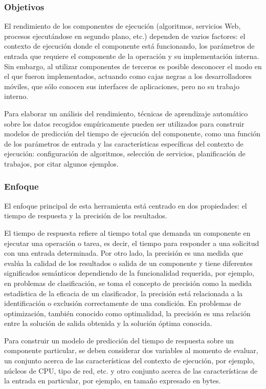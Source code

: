 \subsubsection*{Objetivos}

El rendimiento de los componentes de ejecución (algoritmos, servicios
Web, procesos ejecutándose en segundo plano, etc.) dependen de varios
factores: el contexto de ejecución donde el componente está funcionando,
los parámetros de entrada que requiere el componente de la operación
y su implementación interna. Sin embargo, al utilizar componentes
de terceros es posible desconocer el modo en el que fueron implementados,
actuando como cajas negras a los desarrolladores móviles, que sólo
conocen sus interfaces de aplicaciones, pero no su trabajo interno. 

Para elaborar un análisis del rendimiento, técnicas de aprendizaje
automático sobre los datos recogidos empíricamente pueden ser utilizados
para construir modelos de predicción del tiempo de ejecución del componente,
como una función de los parámetros de entrada y las características
específicas del contexto de ejecución: configuración de algoritmos,
selección de servicios, planificación de trabajos, por citar algunos
ejemplos. 


\subsubsection*{Enfoque}

El enfoque principal de esta herramienta está centrado en dos propiedades:
el tiempo de respuesta y la precisión de los resultados. 

El tiempo de respuesta refiere al tiempo total que demanda un componente
en ejecutar una operación o tarea, es decir, el tiempo para responder
a una solicitud con una entrada determinada. Por otro lado, la precisión
es una medida que evalúa la calidad de los resultados o salida de
un componente y tiene diferentes significados semánticos dependiendo
de la funcionalidad requerida, por ejemplo, en problemas de clasificación,
se toma el concepto de precisión como la medida estadística de la
eficacia de un clasificador, la precisión está relacionada a la identificación
o exclusión correctamente de una condición. En problemas de optimización,
también conocido como optimalidad, la precisión es una relación entre
la solución de salida obtenida y la solución óptima conocida. 

Para construir un modelo de predicción del tiempo de respuesta sobre
un componente particular, se deben considerar dos variables al momento
de evaluar, un conjunto acerca de las características del contexto
de ejecución, por ejemplo, núcleos de CPU, tipo de red, etc. y otro
conjunto acerca de las características de la entrada en particular,
por ejemplo, en tamaño expresado en bytes. 

